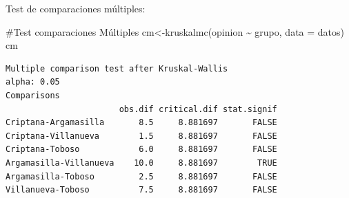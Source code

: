 \documentclass[
  ignorenonframetext,
]{beamer}
\newenvironment{Shaded}{\begin{snugshade}}{\end{snugshade}}
\newcommand{\AttributeTok}[1]{\textcolor[rgb]{0.40,0.45,0.13}{#1}}
\newcommand{\CommentTok}[1]{\textcolor[rgb]{0.37,0.37,0.37}{#1}}
\newcommand{\ConstantTok}[1]{\textcolor[rgb]{0.56,0.35,0.01}{#1}}
\newcommand{\FunctionTok}[1]{\textcolor[rgb]{0.28,0.35,0.67}{#1}}
\newcommand{\NormalTok}[1]{\textcolor[rgb]{0.00,0.23,0.31}{#1}}
\newcommand{\OtherTok}[1]{\textcolor[rgb]{0.00,0.23,0.31}{#1}}
\newcommand{\SpecialCharTok}[1]{\textcolor[rgb]{0.37,0.37,0.37}{#1}}
\newcommand{\StringTok}[1]{\textcolor[rgb]{0.13,0.47,0.30}{#1}}
\begin{document}
\begin{frame}[fragile]
\begin{block}{Test de comparaciones múltiples:}
\label{test-de-comparaciones-muxfaltiples}
\begin{Shaded}
\begin{Highlighting}[]
\CommentTok{\#Test comparaciones Múltiples}
\NormalTok{cm}\OtherTok{\textless{}{-}}\FunctionTok{kruskalmc}\NormalTok{(opinion }\SpecialCharTok{\textasciitilde{}}\NormalTok{ grupo, }\AttributeTok{data =}\NormalTok{ datos)}
\NormalTok{cm}
\end{Highlighting}
\end{Shaded}

\begin{verbatim}
Multiple comparison test after Kruskal-Wallis 
alpha: 0.05 
Comparisons
                       obs.dif critical.dif stat.signif
Criptana-Argamasilla       8.5     8.881697       FALSE
Criptana-Villanueva        1.5     8.881697       FALSE
Criptana-Toboso            6.0     8.881697       FALSE
Argamasilla-Villanueva    10.0     8.881697        TRUE
Argamasilla-Toboso         2.5     8.881697       FALSE
Villanueva-Toboso          7.5     8.881697       FALSE
\end{verbatim}

\begin{Shaded}
\end{Shaded}
\end{block}
\end{frame}
\end{document}
